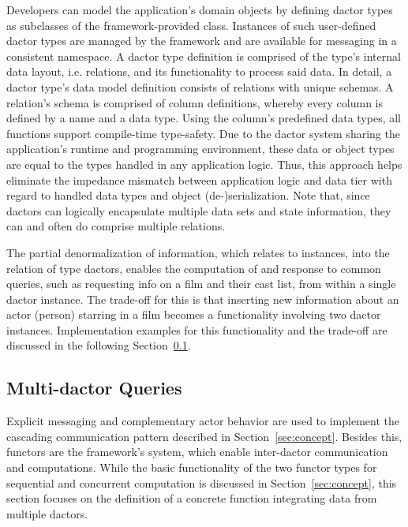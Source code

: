Developers can model the application's domain objects by defining \gls{dactor} types as subclasses of the framework-provided  class.
Instances of such user-defined \gls{dactor} types are managed by the framework and are available for messaging in a consistent namespace.
A \gls{dactor} type definition is comprised of the type's internal data layout, i.e. \glspl{relation}, and its functionality to process said data.
In detail, a \gls{dactor} type's data model definition consists of \glspl{relation} with unique schemas.
A \gls{relation}'s schema is comprised of column definitions, whereby every column is defined by a name and a data type.
Using the column's predefined data types, all functions support compile-time type-safety.
Due to the \gls{dactor} system sharing the application's runtime and programming environment, these data or object types are equal to the types handled in any application logic.
Thus, this approach helps eliminate the impedance mismatch between application logic and data tier with regard to handled data types and object (de-)serialization.
Note that, since \glspl{dactor} can logically encapsulate multiple data sets and state information, they can and often do comprise multiple \glspl{relation}.

The partial denormalization of information, which relates to  instances, into the  \gls{relation} of  type \glspl{dactor},
enables the computation of and response to common queries, such as requesting info on a film and their cast list, from within a single \gls{dactor} instance.
The trade-off for this is that inserting new information about an actor (person) starring in a film becomes a functionality involving two \gls{dactor} instances.
Implementation examples for this functionality and the trade-off are discussed in the following Section~\ref{subsec:multi_dactor_queries}.

\subsection[Multi-Dactor Queries]{Multi-\Gls{dactor} Queries}\label{subsec:multi_dactor_queries}

Explicit messaging and complementary actor behavior are used to implement the cascading communication pattern described in Section~\ref{sec:concept}.
Besides this, \glspl{functor} are the framework's system, which enable inter-\gls{dactor} communication and computations.
While the basic functionality of the two \gls{functor} types for sequential and concurrent computation is discussed in Section~\ref{sec:concept}, this section focuses on the definition of a concrete function integrating data from multiple \glspl{dactor}.

